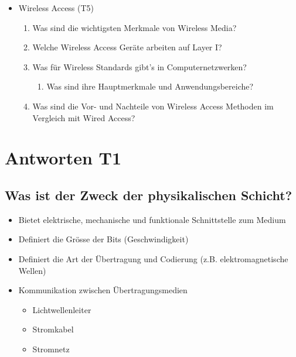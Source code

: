 \begin{itemize}
    \item Wireless Access (T5)
    \begin{enumerate}
        \item Was sind die wichtigsten Merkmale von \flqq{}Wireless Media\frqq?
        \item Welche Wireless Access Geräte arbeiten auf Layer I?
        \item Was für Wireless Standards gibt’s in Computernetzwerken?
        \begin{enumerate}
            \item Was sind ihre Hauptmerkmale und Anwendungsbereiche?
        \end{enumerate}
        \item Was sind die Vor- und Nachteile von \flqq{}Wireless Access\frqq{} Methoden im Vergleich mit \flqq{}Wired Access\frqq?
    \end{enumerate}
\end{itemize}

\section{Antworten T1}
\subsection*{Was ist der Zweck der physikalischen Schicht?}
\begin{itemize}
    \item Bietet elektrische, mechanische und funktionale Schnittstelle zum Medium
    \item Definiert die Grösse der Bits (Geschwindigkeit)
    \item Definiert die Art der Übertragung und Codierung (z.B. elektromagnetische Wellen)
    \item Kommunikation zwischen Übertragungsmedien
    \begin{itemize}
        \item Lichtwellenleiter
        \item Stromkabel
        \item Stromnetz
    \end{itemize}
\end{itemize}

